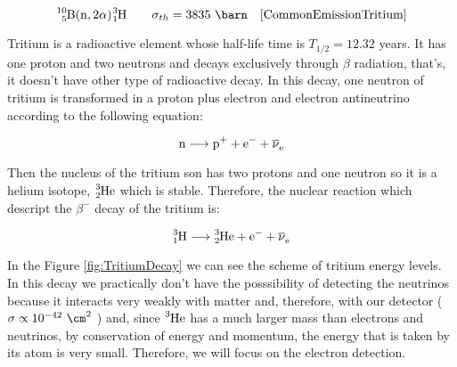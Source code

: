
\begin{equation}
\ce{^{10}_{5}B}(\ce{n},2\alpha)\ce{^{3}_{1}H} \qquad \sigma_{th}= 3835~\barn ~~~\cite{CommonEmissionTritium}
\label{capneuB10}
\end{equation}





Tritium is a radioactive element whose half-life time is $T_{1/2}= 12.32$ years. It has one proton and two neutrons and decays exclusively through $\beta$ radiation, that's, it doesn't have other type of radioactive decay. In this decay, one neutron of tritium is transformed in a proton plus electron and electron antineutrino according to the following equation:

\begin{equation}
\ce{n} \longrightarrow \ce{p^+}  + \ce{e^-}  + \ce{\overline{\nu}_e}
\label{BetaDecay}
\end{equation}

Then the nucleus of the tritium son has two protons and one neutron so it is a helium isotope, $\ce{^{3}_{2}He}$ which is stable. Therefore, the nuclear reaction which descript the $\beta^-$ decay of the tritium is:

\begin{equation}
\ce{^{3}_{1}H} \longrightarrow \ce{^{3}_{2}He}  + \ce{e^-}  + \ce{\overline{\nu}_e}
\label{TritiumDecay}
\end{equation}

In the Figure \ref{fig:TritiumDecay} we can see the scheme of tritium energy levels. In this decay we practically don't have the posssibility of detecting the neutrinos because it interacts very weakly with matter and, therefore, with our detector ($\sigma \propto 10^{-42} ~ \cm^2$ \cite{CrossSeccionNeutrino}) and, since $\ce{^{3}He}$ has a much larger mass than electrons and neutrinos, by conservation of energy and momentum, the energy that is taken by its atom is very small. Therefore, we will focus on the electron detection. 

